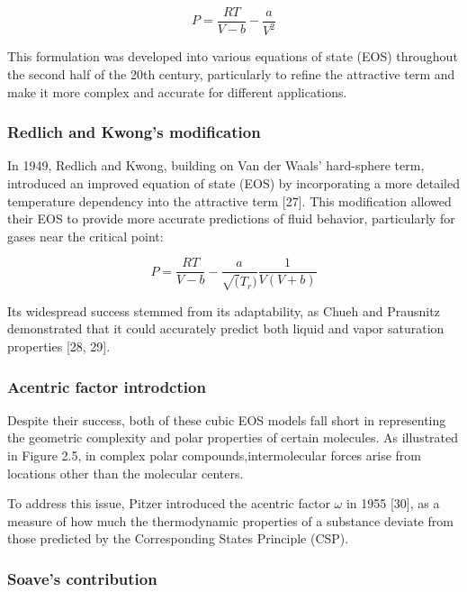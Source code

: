 	\begin{equation}
		P = \frac{RT}{V-b} - \frac{a}{V^2}
	\end{equation}

	This formulation was developed into various equations of state (EOS)
	throughout the second half of the 20th century, particularly to refine the
	attractive term and make it more complex and accurate for different
	applications.

	\subsubsection{Redlich and Kwong's modification}
	
	In 1949, Redlich and Kwong, building on Van der Waals’ hard-sphere term,
	introduced an improved equation of state (EOS) by incorporating a more
	detailed temperature dependency into the attractive term [27]. This
	modification allowed their EOS to provide more accurate predictions of fluid
	behavior, particularly for gases near the critical point:

	\begin{equation}
		P = \frac{RT}{V-b} - \frac{a}{\sqrt(T_r)}\frac{1}{V(V+b)}
	\end{equation}

	Its widespread success stemmed from its adaptability, as Chueh and Prausnitz
	demonstrated that it could accurately predict both liquid and vapor
	saturation properties [28, 29].

	\subsubsection{Acentric factor introdction}

	Despite their success, both of these cubic EOS models fall short in
	representing the geometric complexity and polar properties of certain
	molecules. As illustrated in Figure 2.5, in complex polar
	compounds,intermolecular forces arise from locations other than the
	molecular centers.

	To address this issue, Pitzer introduced the acentric factor $\omega$ in 1955
	[30], as a measure of how much the thermodynamic properties of a substance
	deviate from those predicted by the Corresponding States Principle (CSP).

	\subsubsection{Soave's contribution}

